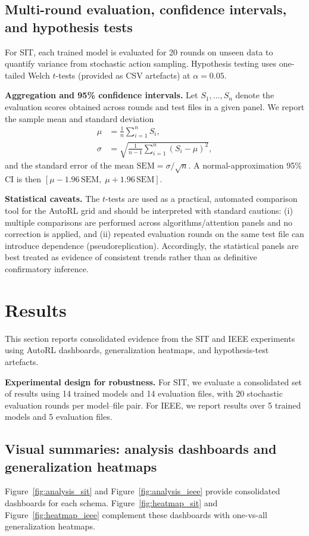 \documentclass[refree,sn-basic]{sn-jnl} %
\begin{document}
\subsection{Multi-round evaluation, confidence intervals, and hypothesis tests}
For SIT, each trained model is evaluated for 20 rounds on unseen data to quantify variance from stochastic action sampling. Hypothesis testing uses one-tailed Welch $t$-tests (provided as CSV artefacts) at $\alpha=0.05$.

\textbf{Aggregation and 95\% confidence intervals.}
Let $S_1,\ldots,S_n$ denote the evaluation scores obtained across rounds and test files in a given panel. We report the sample mean and standard deviation
\begin{align}
\mu &= \frac{1}{n}\sum_{i=1}^{n} S_i,\\
\sigma &= \sqrt{\frac{1}{n-1}\sum_{i=1}^{n}(S_i-\mu)^2},
\end{align}
and the standard error of the mean $\mathrm{SEM}=\sigma/\sqrt{n}$. A normal-approximation 95\% CI is then $[\mu-1.96\,\mathrm{SEM},\;\mu+1.96\,\mathrm{SEM}]$.

\textbf{Statistical caveats.}
The $t$-tests are used as a practical, automated comparison tool for the AutoRL grid and should be interpreted with standard cautions: (i) multiple comparisons are performed across algorithms/attention panels and no correction is applied, and (ii) repeated evaluation rounds on the same test file can introduce dependence (pseudoreplication). Accordingly, the statistical panels are best treated as evidence of consistent trends rather than as definitive confirmatory inference.

\section{Results}
\label{sec:results}
This section reports consolidated evidence from the SIT and IEEE experiments using AutoRL dashboards, generalization heatmaps, and hypothesis-test artefacts.

\textbf{Experimental design for robustness.}
For SIT, we evaluate a consolidated set of results using 14 trained models and 14 evaluation files, with 20 stochastic evaluation rounds per model--file pair. For IEEE, we report results over 5 trained models and 5 evaluation files.

\subsection{Visual summaries: analysis dashboards and generalization heatmaps}
Figure~\ref{fig:analysis_sit} and Figure~\ref{fig:analysis_ieee} provide consolidated dashboards for each schema. Figure~\ref{fig:heatmap_sit} and Figure~\ref{fig:heatmap_ieee} complement these dashboards with one-vs-all generalization heatmaps.
\end{document}
